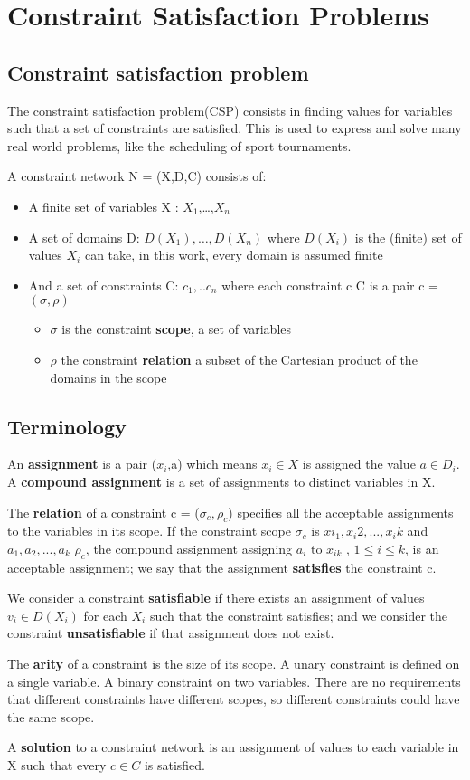 \section{Constraint Satisfaction Problems}

\subsection{Constraint satisfaction problem}
The constraint satisfaction problem(CSP) consists in finding values for variables such that a set of constraints are satisfied. This is used to express and solve many real world problems, like the scheduling of sport tournaments. 

A constraint network N = (X,D,C) consists of:
\begin{itemize}
    \item A finite set of variables X : {$X_1$,…,$X_n$}
    \item A set of domains D: {$D(X_1),…,D(X_n)$} where $D(X_i)$ is the (finite) set of values $X_i$ can take, in this work, every domain is assumed finite
    \item And a set of constraints C: {$c_1, .. c_n$} where each constraint c \in C is a pair c = $(\sigma, \rho)$
    \begin{itemize}
        \item $\sigma$ is the constraint \textbf{scope}, a set of variables
        \item $\rho$ the constraint \textbf{relation} a subset of the Cartesian product of the domains in the scope
    \end{itemize}
\end{itemize}

\subsection{ Terminology}
An \textbf{assignment} is a pair ($x_i$,a) which means $x_i \in X$ is assigned the value $a \in D_i$. A \textbf{compound assignment} is a set of assignments to distinct variables in X.

The \textbf{relation} of a constraint c =  ($\sigma_c, \rho_c$) specifies all the acceptable assignments to the variables in its scope. If the constraint scope $\sigma_c$ is ${xi_1 , x_i2 , ..., x_ik}$ and ${a_1, a_2, ..., a_k}$ \in $\rho_c$, the compound assignment assigning $a_i$ to $x_{ik}$ , $1 \leq i \leq k$, is an acceptable assignment; we say that the assignment \textbf{satisfies} the constraint c.

We consider a constraint \textbf{satisfiable} if there exists an assignment of values $v_i \in D(X_i)$ for each $X_i$ such that the constraint satisfies; and we consider the constraint \textbf{unsatisfiable} if that assignment does not exist. 

The \textbf{arity} of a constraint is the size of its scope. A unary constraint is defined on a single variable. A binary constraint on two variables. There are no requirements that different constraints have different scopes, so different constraints could have the same scope.

A \textbf{solution} to a constraint network is an assignment of values to each variable in X such that every $c \in C$ is satisfied. 
